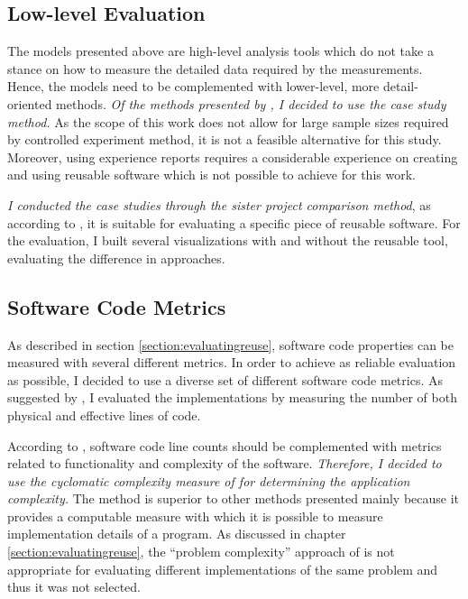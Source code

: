 \subsection{Low-level Evaluation}

The models presented above are high-level analysis tools which do not take a stance on how to measure the detailed data required by the measurements. Hence, the models need to be complemented with lower-level, more detail-oriented methods. \emph{Of the methods presented by \citet{mohagheghi_quality_2007}, I decided to use the case study method.} As the scope of this work does not allow for large sample sizes required by controlled experiment method, it is not a feasible alternative for this study. Moreover, using experience reports requires a considerable experience on creating and using reusable software which is not possible to achieve for this work.

\emph{I conducted the case studies through the sister project comparison method}, as according to \citet{mohagheghi_quality_2007}, it is suitable for evaluating a specific piece of reusable software. For the evaluation, I built several visualizations with and without the reusable tool, evaluating the difference in approaches.

\subsection{Software Code Metrics}

As described in section \ref{section:evaluatingreuse}, software code properties can be measured with several different metrics. In order to achieve as reliable evaluation as possible, I decided to use a diverse set of different software code metrics. As suggested by \citet{fenton_software_1998}, I evaluated the implementations by measuring the number of both physical and effective lines of code.

According to \citet{fenton_software_1998}, software code line counts should be complemented with metrics related to functionality and complexity of the software. \emph{Therefore, I decided to use the cyclomatic complexity measure of \citet{mccabe_complexity_1976} for determining the application complexity.} The method is superior to other methods presented mainly because it provides a computable measure with which it is possible to measure implementation details of a program. As discussed in chapter \ref{section:evaluatingreuse}, the ``problem complexity'' approach of \citet{fenton_software_1998} is not appropriate for evaluating different implementations of the same problem and thus it was not selected.

